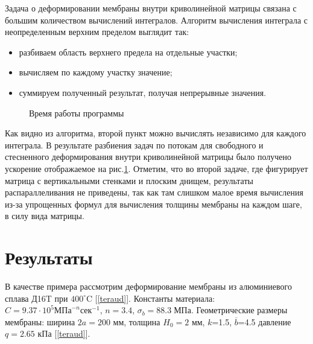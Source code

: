 Задача о деформировании мембраны внутри криволинейной матрицы связана с большим количеством вычислений интегралов. Алгоритм вычисления интеграла с неопределенным верхним пределом выглядит так:
\begin{itemize}
\item разбиваем область верхнего предела на отдельные участки;
\item вычисляем по каждому участку значение;
\item суммируем полученный результат, получая непрерывные значения.
\end{itemize}
		\begin{figure}[h!]
				\caption{ Время работы программы } 
				\label{parall_results}
	    \end{figure}

Как видно из алгоритма, второй пункт можно вычислять независимо для каждого интеграла. В результате разбиения задач по потокам для свободного и стесненного деформирования внутри криволинейной матрицы было получено ускорение отображаемое на рис.\ref{parall_results}. Отметим, что во второй задаче, где фигурирует матрица с вертикальными стенками и плоским днищем, результаты распараллеливания не приведены, так как там слишком малое время вычисления из-за упрощенных формул для вычисления толщины мембраны на каждом шаге, в силу вида матрицы.


	    
\section{Результаты\label{section_2}}
	В качестве примера рассмотрим деформирование мембраны из алюминиевого сплава Д16T при $400^\circ\text{C}$ [\ref{teraud}]. Константы материала: 
   $C=9.37\cdot10^5 \text{МПа}^{-n}\text{сек}^{-1}$, $n=3.4$, $\sigma_b = 88.3\; \text{МПа}$. 
   Геометрические размеры мембраны: ширина $2a=200$ мм, толщина $H_0=2$ мм, $k$=1.5, $\overline{b}$=4.5 давление $q=2.65$ кПа [\ref{teraud}].  
   
